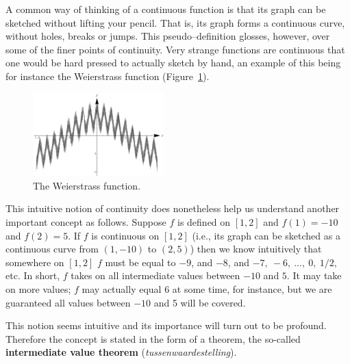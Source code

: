 A common way of thinking of a continuous function is that its graph can be sketched without lifting your pencil. That is, its graph forms a continuous curve, without holes, breaks or jumps. This pseudo--definition glosses, however, over some of the finer points of continuity. Very strange functions are continuous that one would be hard pressed to actually sketch by hand, an example of this being for instance the Weierstrass function (Figure~\ref{fig_lim_16}). 
\begin{figure}[H]
	\begin{center}
			\includegraphics[width=0.45\textwidth]{fig_lim_16}
	\caption{The Weierstrass function.}
	\label{fig_lim_16}
	\end{center}
\end{figure}

	\ifcourse
		\checkoddpage
{}
 \fi
This intuitive notion of continuity does nonetheless help us understand another important concept as follows. Suppose $f$ is defined on $[1,2]$ and $f(1) = -10$ and $f(2) = 5$. If $f$ is continuous on $[1,2]$ (i.e., its graph can be sketched as a continuous curve from $(1,-10)$ to $(2,5)$) then we know intuitively that somewhere on $[1,2]$ $f$ must be equal to $-9$, and $-8$, and $-7,\ -6,\ \ldots,\ 0,\ 1/2,$ etc. In short, $f$ takes on all intermediate values between $-10$ and $5$. It may take on more values; $f$ may actually equal 6 at some time, for instance, but we are guaranteed all values between $-10$ and 5 will be covered. 

This notion seems intuitive and its importance will turn out to be profound. Therefore the concept is stated in the form of a theorem, the so-called \textbf{intermediate value theorem} (\textit{tussenwaardestelling}).

